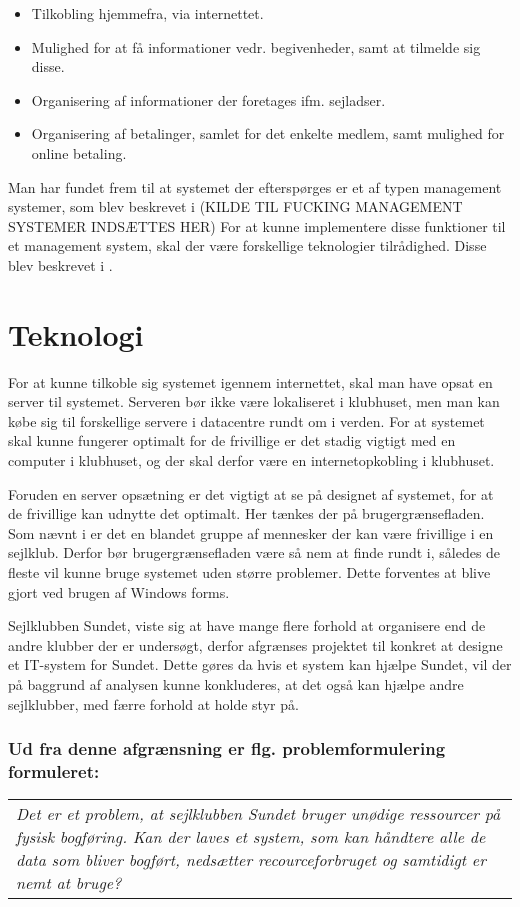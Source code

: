\begin{itemize}
	\item Tilkobling hjemmefra, via internettet.
	\item Mulighed for at få informationer vedr. begivenheder, samt at tilmelde sig disse.
	\item Organisering af informationer der foretages ifm. sejladser.
	\item Organisering af betalinger, samlet for det enkelte medlem, samt mulighed for online betaling.
\end{itemize}

Man har fundet frem til at systemet der efterspørges er et af typen management systemer, som blev beskrevet i (KILDE TIL FUCKING MANAGEMENT SYSTEMER INDSÆTTES HER)
For at kunne implementere disse funktioner til et management system, skal der være forskellige teknologier tilrådighed. Disse blev beskrevet i .

\section{Teknologi}

For at kunne tilkoble sig systemet igennem internettet, skal man have opsat en server til systemet. Serveren bør ikke være lokaliseret i klubhuset, men man kan købe sig til forskellige servere i datacentre rundt om i verden. For at systemet skal kunne fungerer optimalt for de frivillige er det stadig vigtigt med en computer i klubhuset, og der skal derfor være en internetopkobling i klubhuset.

Foruden en server opsætning er det vigtigt at se på designet af systemet, for at de frivillige kan udnytte det optimalt. Her tænkes der på brugergrænsefladen. Som nævnt i  er det en blandet gruppe af mennesker der kan være frivillige i en sejlklub. Derfor bør brugergrænsefladen være så nem at finde rundt i, således de fleste vil kunne bruge systemet uden større problemer. Dette forventes at blive gjort ved brugen af Windows forms.

Sejlklubben Sundet, viste sig at have mange flere forhold at organisere end de andre klubber der er undersøgt, derfor afgrænses projektet til konkret at designe et IT-system for Sundet. Dette gøres da hvis et system kan hjælpe Sundet, vil der på baggrund af analysen kunne konkluderes, at det også kan hjælpe andre sejlklubber, med færre forhold at holde styr på. 

\subsubsection*{Ud fra denne afgrænsning er flg. problemformulering formuleret:}
\begin{center}
\begin{tabular}{|p{14cm}|}
\textit{Det er et problem, at sejlklubben Sundet bruger unødige ressourcer på fysisk bogføring. Kan der laves et system, som kan håndtere alle de data som bliver bogført, nedsætter recourceforbruget og samtidigt er nemt at bruge? }
\end{tabular}
\end{center}
